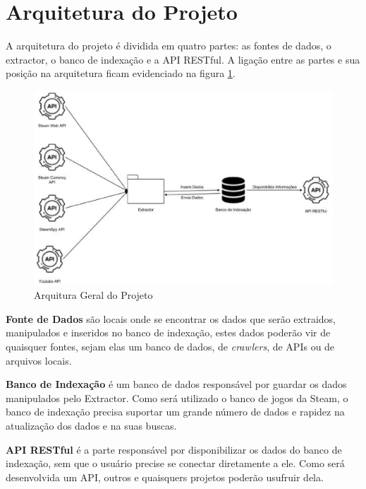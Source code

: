 \section{Arquitetura do Projeto}
A arquitetura do projeto é dividida em quatro partes: as fontes de dados, o extractor, o banco de indexação e a API RESTful. A ligação entre as partes e sua posição na arquitetura ficam evidenciado na figura \ref{image:arquitetura}.
\begin{figure} [H]
\centering
\includegraphics[scale=0.5]{figuras/arquiteturaProjeto.eps}
\caption{Arquitura Geral do Projeto}
\label{image:arquitetura}
\end{figure}
\textbf{Fonte de Dados} são locais onde se encontrar os dados que serão extraidos, manipulados e inseridos no banco de indexação, estes dados poderão vir de quaisquer fontes, sejam elas um banco de dados, de \textit{crawlers}, de APIs ou de arquivos locais.

\textbf{Banco de Indexação} é um banco de dados responsável por guardar os dados manipulados pelo Extractor. Como será utilizado o banco de jogos da Steam, o banco de indexação precisa suportar um grande número de dados e rapidez na atualização dos dados e na suas buscas.

\textbf{API RESTful} é a parte responsável por disponibilizar os dados do banco de indexação, sem que o usuário precise se conectar diretamente a ele. Como será desenvolvida um API, outros e quaisquers projetos poderão usufruir dela.

